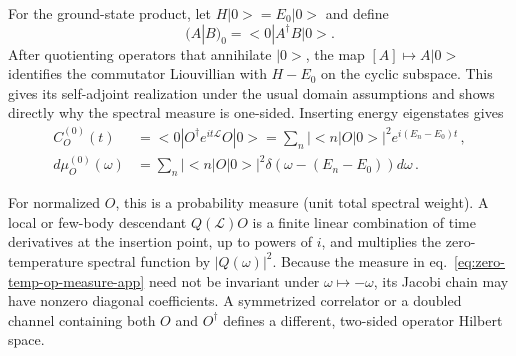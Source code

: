 \documentclass[a4paper,11pt]{article}
\def\ket#1{|#1>}%
\def\bra#1{<#1|}%
\def\dd{d}%
\def\ii{i}%
\def\ee{e}%
\theoremstyle{definition}
\theoremstyle{remark}
\newcommand{\ket}[1]{|#1\rangle}
\newcommand{\bra}[1]{\langle #1|}
\newcommand{\dd}{\mathrm d}
\newcommand{\ii}{\mathrm i}
\newcommand{\ee}{\mathrm e}
\begin{document}
For the ground-state product, let 
$H\ket0=E_0\ket0$ and define
\begin{equation}
   (A|B)_0=\bra0A^\dagger B\ket0.
\end{equation}
After quotienting operators that annihilate $\ket0$, the map
$[A]\mapsto A\ket0$ identifies the commutator Liouvillian with
$H-E_0$ on the cyclic subspace.  This gives its self-adjoint realization
under the usual domain assumptions and shows directly why the spectral
measure is one-sided.  Inserting energy eigenstates gives
\begin{align}
   C_O^{(0)}(t)
   &=\bra0O^\dagger\ee^{\ii t\mathcal L}O\ket0
   =\sum_n|\bra nO\ket0|^2\ee^{\ii(E_n-E_0)t}\,, 
   \label{eq:zero-temp-op-corr-app} \\
   \dd\mu_O^{(0)}(\omega)
   &=\sum_n|\bra nO\ket0|^2
      \delta\!\left(\omega-(E_n-E_0)\right)\dd\omega\,.
   \label{eq:zero-temp-op-measure-app}
\end{align}

For normalized $O$, this is a probability measure (unit total
spectral weight). A local or few-body descendant $Q(\mathcal L)O$ is a finite linear combination of time
derivatives at the insertion point, up to powers of $\ii$, and multiplies
the zero-temperature spectral function by $|Q(\omega)|^2$.  Because the
measure in eq.~\eqref{eq:zero-temp-op-measure-app} need not be invariant
under $\omega\mapsto-\omega$, its Jacobi chain may have nonzero diagonal
coefficients.  A symmetrized correlator or a doubled channel containing
both $O$ and $O^\dagger$ defines a different, two-sided operator
Hilbert space.
\end{document}
